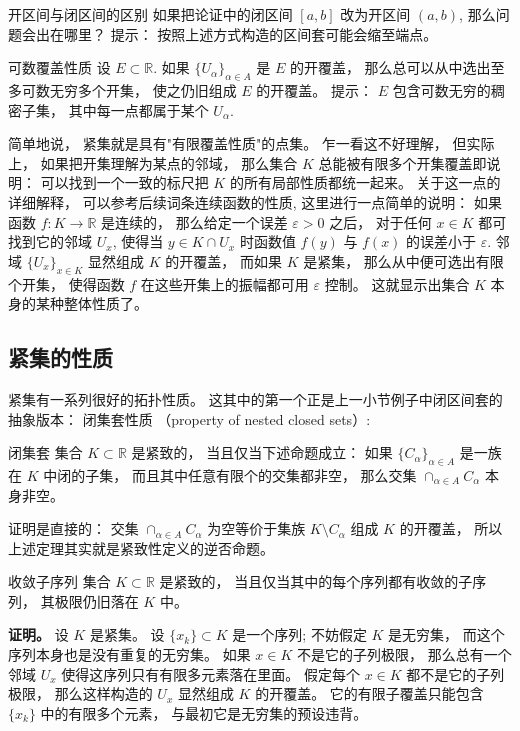 \begin{exercise}{开区间与闭区间的区别}
如果把论证中的闭区间 $[a,b]$ 改为开区间 $(a,b)$, 那么问题会出在哪里？ 提示： 按照上述方式构造的区间套可能会缩至端点。
\end{exercise}

\begin{exercise}{可数覆盖性质}
设 $E\subset\mathbb{R}$. 如果 $\{U_\alpha\}_{\alpha\in A}$ 是 $E$ 的开覆盖， 那么总可以从中选出至多可数无穷多个开集， 使之仍旧组成 $E$ 的开覆盖。 提示： $E$ 包含可数无穷的稠密子集， 其中每一点都属于某个 $U_\alpha$.
\end{exercise}

简单地说， 紧集就是具有"有限覆盖性质"的点集。 乍一看这不好理解， 但实际上， 如果把开集理解为某点的邻域， 那么集合 $K$ 总能被有限多个开集覆盖即说明： 可以找到一个一致的标尺把 $K$ 的所有局部性质都统一起来。 关于这一点的详细解释， 可以参考后续词条连续函数的性质, 这里进行一点简单的说明： 如果函数 $f:K\to\mathbb{R}$ 是连续的， 那么给定一个误差 $\varepsilon>0$ 之后， 对于任何 $x\in K$ 都可找到它的邻域 $U_{x}$, 使得当 $y\in K\cap U_x$ 时函数值 $f(y)$ 与 $f(x)$ 的误差小于 $\varepsilon$. 邻域 $\{U_x\}_{x\in K}$ 显然组成 $K$ 的开覆盖， 而如果 $K$ 是紧集， 那么从中便可选出有限个开集， 使得函数 $f$ 在这些开集上的振幅都可用 $\varepsilon$ 控制。 这就显示出集合 $K$ 本身的某种整体性质了。

\subsection{紧集的性质}
紧集有一系列很好的拓扑性质。 这其中的第一个正是上一小节例子中闭区间套的抽象版本： 闭集套性质 （property of nested closed sets）:

\begin{theorem}{闭集套}
集合 $K\subset\mathbb{R}$ 是紧致的， 当且仅当下述命题成立： 如果 $\{C_\alpha\}_{\alpha\in A}$ 是一族在 $K$ 中闭的子集， 而且其中任意有限个的交集都非空， 那么交集 $\cap_{\alpha\in A}C_\alpha$ 本身非空。 
\end{theorem}

证明是直接的： 交集 $\cap_{\alpha\in A}C_\alpha$ 为空等价于集族 $K\setminus C_\alpha$ 组成 $K$ 的开覆盖， 所以上述定理其实就是紧致性定义的逆否命题。

\begin{theorem}{收敛子序列}
集合 $K\subset\mathbb{R}$ 是紧致的， 当且仅当其中的每个序列都有收敛的子序列， 其极限仍旧落在 $K$ 中。
\end{theorem}

\textbf{证明。} 设 $K$ 是紧集。 设 $\{x_k\}\subset K$ 是一个序列; 不妨假定 $K$ 是无穷集， 而这个序列本身也是没有重复的无穷集。 如果 $x\in K$ 不是它的子列极限， 那么总有一个邻域 $U_x$ 使得这序列只有有限多元素落在里面。 假定每个 $x\in K$ 都不是它的子列极限， 那么这样构造的 $U_x$ 显然组成 $K$ 的开覆盖。 它的有限子覆盖只能包含 $\{x_k\}$ 中的有限多个元素， 与最初它是无穷集的预设违背。

